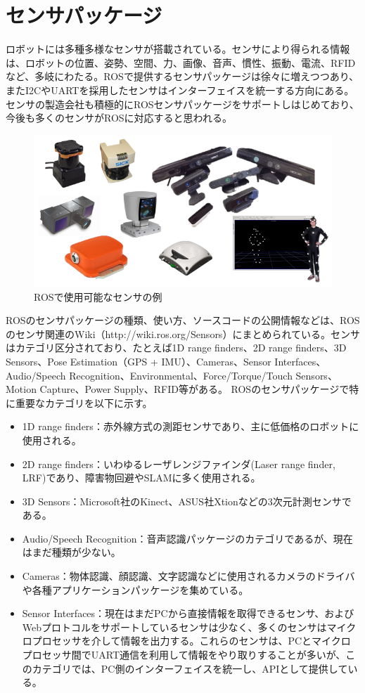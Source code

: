 \section{センサパッケージ}

ロボットには多種多様なセンサが搭載されている。センサにより得られる情報は、ロボットの位置、姿勢、空間、力、画像、音声、慣性、振動、電流、RFIDなど、多岐にわたる。ROSで提供するセンサパッケージは徐々に増えつつあり、またI2CやUARTを採用したセンサはインターフェイスを統一する方向にある。センサの製造会社も積極的にROSセンサパッケージをサポートしはじめており、今後も多くのセンサがROSに対応すると思われる。

\begin{figure}[htp]
  \centering
  \includegraphics[width=\columnwidth]{pictures/chapter7/pic_07_03.png}
  \caption{ROSで使用可能なセンサの例}
\end{figure}

ROSのセンサパッケージの種類、使い方、ソースコードの公開情報などは、ROSのセンサ関連のWiki（http://wiki.ros.org/Sensors）にまとめられている。センサはカテゴリ区分されており、たとえば1D range finders、2D range finders、3D Sensors、Pose Estimation（GPS + IMU）、Cameras、Sensor Interfaces、Audio/Speech Recognition、Environmental、Force/Torque/Touch Sensors、Motion Capture、Power Supply、RFID等がある。
 ROSのセンサパッケージで特に重要なカテゴリを以下に示す。

\begin{itemize}
\item 1D range finders：赤外線方式の測距センサであり、主に低価格のロボットに使用される。
\item 2D range finders：いわゆるレーザレンジファインダ(Laser range finder, LRF)であり、障害物回避やSLAMに多く使用される。
\item 3D Sensors：Microsoft社のKinect、ASUS社Xtionなどの3次元計測センサである。
\item Audio/Speech Recognition：音声認識パッケージのカテゴリであるが、現在はまだ種類が少ない。
\item Cameras：物体認識、顔認識、文字認識などに使用されるカメラのドライバや各種アプリケーションパッケージを集めている。
\item Sensor Interfaces：現在はまだPCから直接情報を取得できるセンサ、およびWebプロトコルをサポートしているセンサは少なく、多くのセンサはマイクロプロセッサを介して情報を出力する。これらのセンサは、PCとマイクロプロセッサ間でUART通信を利用して情報をやり取りすることが多いが、このカテゴリでは、PC側のインターフェイスを統一し、APIとして提供している。
\end{itemize}

